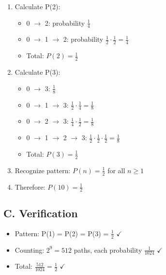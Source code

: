 \documentclass[11pt]{article}
\begin{document}
\begin{solutionbox}
\begin{enumerate}[leftmargin=*]
    \item Calculate P(2):
    \begin{itemize}
        \item 0 $\to$ 2: probability $\frac{1}{4}$
        \item 0 $\to$ 1 $\to$ 2: probability $\frac{1}{2} \cdot \frac{1}{2} = \frac{1}{4}$
        \item Total: $P(2) = \frac{1}{2}$
    \end{itemize}
    
    \item Calculate P(3):
    \begin{itemize}
        \item 0 $\to$ 3: $\frac{1}{8}$
        \item 0 $\to$ 1 $\to$ 3: $\frac{1}{2} \cdot \frac{1}{4} = \frac{1}{8}$
        \item 0 $\to$ 2 $\to$ 3: $\frac{1}{4} \cdot \frac{1}{2} = \frac{1}{8}$
        \item 0 $\to$ 1 $\to$ 2 $\to$ 3: $\frac{1}{2} \cdot \frac{1}{2} \cdot \frac{1}{2} = \frac{1}{8}$
        \item Total: $P(3) = \frac{1}{2}$
    \end{itemize}
    
    \item Recognize pattern: $P(n) = \frac{1}{2}$ for all $n \geq 1$
    
    \item Therefore: $P(10) = \frac{1}{2}$
\end{enumerate}

\subsection*{C. Verification}
\begin{itemize}[leftmargin=*]
    \item Pattern: P(1) = P(2) = P(3) = $\frac{1}{2}$ $\checkmark$
    \item Counting: $2^9 = 512$ paths, each probability $\frac{1}{1024}$ $\checkmark$
    \item Total: $\frac{512}{1024} = \frac{1}{2}$ $\checkmark$
\end{itemize}
\end{solutionbox}
\end{document}
